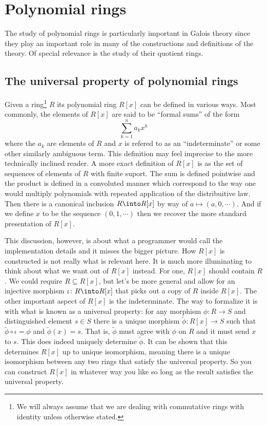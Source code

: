 \documentclass[12pt,oneside]{book}
\begin{document}
\section{Polynomial rings}
The study of polynomial rings is particularly important in Galois theory since they play an important role in many of the constructions and definitions of the theory. Of special relevance is the study of their quotient rings.  

\subsection{The universal property of polynomial rings}
Given a ring\footnote{We will always assume that we are dealing with commutative rings with identity unless otherwise stated.} \( R \) its polynomial ring \( R[x] \) can be defined in various ways. Most commonly, the elements of \( R[x] \) are said to be ``formal sums'' of the form
\begin{equation*}
	\sum_{k = 1}^{n} a_k x^k 
\end{equation*}
where the \( a_k \) are elements of \( R \) and \( x \) is refered to as an ``indeterminate'' or some other similarly ambiguous term. This definition may feel imprecise to the more technically inclined reader. A more exact definition of \( R[x] \) is as the set of sequences of elements of \( R \) with finite suport. The sum is defined pointwise and the product is defined in a convoluted manner which correspond to the way one would multiply polynomials with repeated application of the distribuitive law. Then there is a canonical inclusion \( R \into R[x] \) by way of \( a \mapsto (a,0, \cdots) \). And if we define \( x \) to be the sequence \( (0,1, \cdots) \) then we recover the more standard presentation of \( R[x] \).

This discussion, however, is about what a programmer would call the implementation details and it misses the bigger picture. How \( R[x] \) is constructed is not really what is relevant here. It is much more illuminating to think about what we want out of \( R[x] \) instead. For one, \( R[x] \) should contain \( R \). We could require \( R \subseteq R[x] \), but let's be more general and allow for an injective morphism \( \iota \colon R \into R[x] \) that picks out a copy of \( R \) inside \( R[x] \). The other important aspect of \( R[x] \) is the indeterminate. The way to formalize it is with what is known as a universal property: for any morphism \( \phi \colon R \to S \) and distinguished element \( s \in S \) there is a unique morphism \( \tilde{\phi} \colon R[x] \to S \) such that \( \tilde{\phi} \circ \iota = \phi \) and \( \tilde{\phi}(x) = s \). That is, \( \tilde{\phi} \) must agree with \( \phi \) on \( R \) and it must send \( x \) to \( s \). This does indeed uniquely determine \( \tilde{\phi} \). It can be shown that this determines \( R[x] \) up to unique isomorphism, meaning there is a unique isomorphism between any two rings that satisfy the universal property. So you can construct \( R[x] \) in whatever way you like so long as the result satisfies the universal property.
\end{document}
